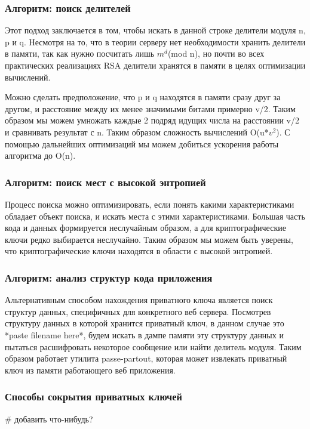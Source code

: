 \documentclass[20pt]{article}
\begin{document}
\subsubsection{Алгоритм: поиск делителей}
Этот подход заключается в том, чтобы искать в данной строке делители модуля n,
p и q. Несмотря на то, что в теории серверу нет необходимости хранить делители в
памяти, так как нужно посчитать лишь $m^d$(mod n), но почти во всех практических
реализациях RSA делители хранятся в памяти в целях оптимизации вычислений.

Можно сделать предположение, что p и q находятся в памяти сразу друг за другом,
и расстояние между их менее значимыми битами примерно v/2. Таким образом мы можем
умножать каждые 2 подряд идущих числа на расстоянии v/2 и сравнивать результат с
n. Таким образом сложность вычислений O(u*$v^2$). С помощью дальнейших оптимизаций
мы можем добиться ускорения работы алгоритма до O(n).

\subsubsection{Алгоритм: поиск мест с высокой энтропией}
Процесс поиска можно оптимизировать, если понять какими характеристиками обладает
объект поиска, и искать места с этими характеристиками. Большая часть кода и данных
формируется неслучайным образом, а для криптографические ключи редко выбирается
неслучайно. Таким образом мы можем быть уверены, что криптографические ключи находятся
в области с высокой энтропией.

\subsubsection{Алгоритм: анализ структур кода приложения}
Альтернативным способом нахождения приватного ключа является поиск структур
данных, специфичных для конкретного веб сервера. Посмотрев структуру данных в которой
хранится приватный ключ, в данном случае это *paste filename here*, будем искать
в дампе памяти эту структуру данных и пытаться расшифровать некоторое сообщение
или найти делитель модуля. Таким образом работает утилита passe-partout, которая
может извлекать приватный ключ из памяти работающего веб приложения.

\subsubsection{Способы сокрытия приватных ключей}
\# добавить что-нибудь?
\end{document}
